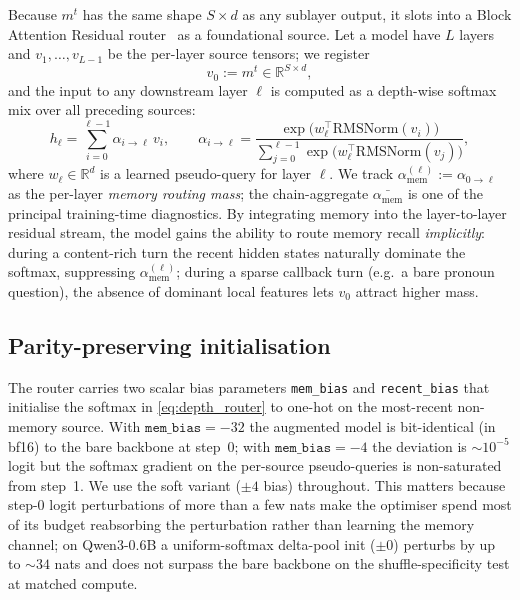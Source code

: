 \documentclass[11pt]{article}
\newcommand{\mt}{m^t}
\newcommand{\amem}{\alpha_{\mathrm{mem}}}
\begin{document}
Because $\mt$ has the same shape $S \times d$ as any sublayer
output, it slots into a Block Attention Residual
router~\citep{du2026attention} as a foundational source. Let a model
have $L$ layers and $v_1, \dots, v_{L-1}$ be the per-layer source
tensors; we register
\begin{equation}
v_0 := \mt \in \mathbb{R}^{S \times d},
\end{equation}
and the input to any downstream layer $\ell$ is computed as a
depth-wise softmax mix over all preceding sources:
\begin{equation}
h_\ell = \sum_{i=0}^{\ell-1} \alpha_{i \to \ell}\, v_i,
\qquad
\alpha_{i \to \ell} = \frac{\exp\bigl(w_\ell^\top \mathrm{RMSNorm}(v_i)\bigr)}
                           {\sum_{j=0}^{\ell-1} \exp\bigl(w_\ell^\top \mathrm{RMSNorm}(v_j)\bigr)},
\label{eq:depth_router}
\end{equation}
where $w_\ell \in \mathbb{R}^d$ is a learned pseudo-query for layer
$\ell$. We track $\amem^{(\ell)} := \alpha_{0 \to \ell}$ as the per-layer
\emph{memory routing mass}; the chain-aggregate
$\bar{\amem}$ is one of the principal training-time diagnostics.
By integrating memory into the layer-to-layer residual stream, the model
gains the ability to route memory recall \emph{implicitly}: during a
content-rich turn the recent hidden states naturally dominate the
softmax, suppressing $\amem^{(\ell)}$; during a sparse callback turn
(e.g.\ a bare pronoun question), the absence of dominant local
features lets $v_0$ attract higher mass.

\subsection{Parity-preserving initialisation}
\label{sec:parity_init}

The router carries two scalar bias parameters
\texttt{mem\_bias} and \texttt{recent\_bias} that initialise the
softmax in \eqref{eq:depth_router} to one-hot on the most-recent
non-memory source. With $\texttt{mem\_bias} = -32$ the augmented
model is bit-identical (in bf16) to the bare backbone at step~0; with
$\texttt{mem\_bias} = -4$ the deviation is $\sim 10^{-5}$ logit but the
softmax gradient on the per-source pseudo-queries is non-saturated
from step~1. We use the soft variant ($\pm 4$ bias) throughout. This
matters because step-0 logit perturbations of more than a few nats
make the optimiser spend most of its budget reabsorbing the
perturbation rather than learning the memory channel; on Qwen3-0.6B
a uniform-softmax delta-pool init ($\pm 0$) perturbs by up to
$\sim 34$ nats and does not surpass the bare backbone on the
shuffle-specificity test at matched compute.
\end{document}
